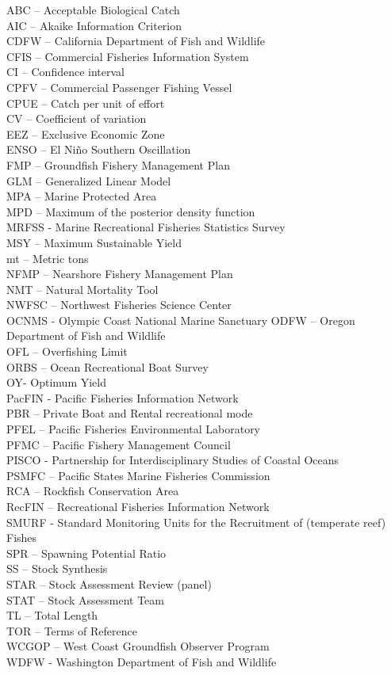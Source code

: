 \documentclass[11pt,
  english,
  letterpaper,
]{article}
\begin{document}
ABC -- Acceptable Biological Catch\\
AIC -- Akaike Information Criterion\\
CDFW -- California Department of Fish and Wildlife\\
CFIS -- Commercial Fisheries Information System\\
CI -- Confidence interval\\
CPFV -- Commercial Passenger Fishing Vessel\\
CPUE -- Catch per unit of effort\\
CV -- Coefficient of variation\\
EEZ -- Exclusive Economic Zone\\
ENSO -- El Niño Southern Oscillation\\
FMP -- Groundfish Fishery Management Plan\\
GLM -- Generalized Linear Model\\
MPA -- Marine Protected Area\\
MPD -- Maximum of the posterior density function\\
MRFSS - Marine Recreational Fisheries Statistics Survey\\
MSY -- Maximum Sustainable Yield\\
mt -- Metric tons\\
NFMP -- Nearshore Fishery Management Plan\\
NMT -- Natural Mortality Tool\\
NWFSC -- Northwest Fisheries Science Center\\
OCNMS - Olympic Coast National Marine Sanctuary ODFW -- Oregon Department of Fish and Wildlife\\
OFL -- Overfishing Limit\\
ORBS -- Ocean Recreational Boat Survey\\
OY- Optimum Yield\\
PacFIN - Pacific Fisheries Information Network\\
PBR -- Private Boat and Rental recreational mode\\
PFEL -- Pacific Fisheries Environmental Laboratory\\
PFMC -- Pacific Fishery Management Council\\
PISCO - Partnership for Interdisciplinary Studies of Coastal Oceans\\
PSMFC -- Pacific States Marine Fisheries Commission\\
RCA -- Rockfish Conservation Area\\
RecFIN -- Recreational Fisheries Information Network\\
SMURF - Standard Monitoring Units for the Recruitment of (temperate reef) Fishes\\
SPR -- Spawning Potential Ratio\\
SS -- Stock Synthesis\\
STAR -- Stock Assessment Review (panel)\\
STAT -- Stock Assessment Team\\
TL -- Total Length\\
TOR -- Terms of Reference\\
WCGOP -- West Coast Groundfish Observer Program\\
WDFW - Washington Department of Fish and Wildlife
\end{document}
